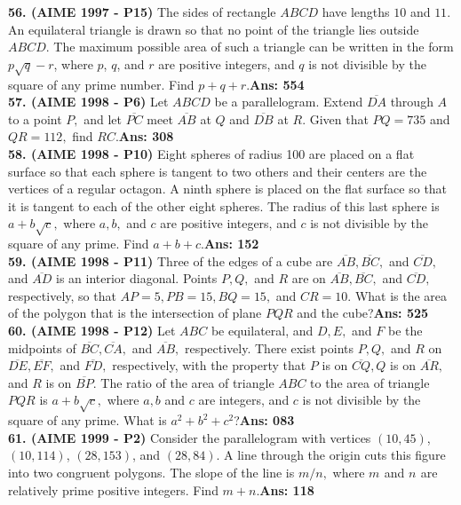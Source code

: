 \documentclass[letterpaper,10pt,addpoints]{exam}
\begin{document}
\textbf{56. (AIME 1997 - P15) }The sides of rectangle $ABCD$ have lengths $10$ and $11$. An equilateral triangle is drawn so that no point of the triangle lies outside $ABCD$. The maximum possible area of such a triangle can be written in the form $p\sqrt{q}-r$, where $p$, $q$, and $r$ are positive integers, and $q$ is not divisible by the square of any prime number. Find $p+q+r$.\quad\textbf{Ans: 554}\\

\textbf{57. (AIME 1998 - P6) }Let $ABCD$ be a parallelogram. Extend $\overline{DA}$ through $A$ to a point $P,$ and let $\overline{PC}$ meet $\overline{AB}$ at $Q$ and $\overline{DB}$ at $R.$ Given that $PQ = 735$ and $QR = 112,$ find $RC.$\quad\textbf{Ans: 308}\\

\textbf{58. (AIME 1998 - P10) }Eight spheres of radius 100 are placed on a flat surface so that each sphere is tangent to two others and their centers are the vertices of a regular octagon. A ninth sphere is placed on the flat surface so that it is tangent to each of the other eight spheres. The radius of this last sphere is $a +b\sqrt {c},$ where $a, b,$ and $c$ are positive integers, and $c$ is not divisible by the square of any prime. Find $a + b + c$.\quad\textbf{Ans: 152}\\

\textbf{59. (AIME 1998 - P11) }Three of the edges of a cube are $\overline{AB}, \overline{BC},$ and $\overline{CD},$ and $\overline{AD}$ is an interior diagonal. Points $P, Q,$ and $R$ are on $\overline{AB}, \overline{BC},$ and $\overline{CD},$ respectively, so that $AP = 5, PB = 15, BQ = 15,$ and $CR = 10.$ What is the area of the polygon that is the intersection of plane $PQR$ and the cube?\textbf{Ans: 525}\\

\textbf{60. (AIME 1998 - P12) }Let $ABC$ be equilateral, and $D, E,$ and $F$ be the midpoints of $\overline{BC}, \overline{CA},$ and $\overline{AB},$ respectively. There exist points $P, Q,$ and $R$ on $\overline{DE}, \overline{EF},$ and $\overline{FD},$ respectively, with the property that $P$ is on $\overline{CQ}, Q$ is on $\overline{AR},$ and $R$ is on $\overline{BP}.$ The ratio of the area of triangle $ABC$ to the area of triangle $PQR$ is $a + b\sqrt {c},$ where $a, b$ and $c$ are integers, and $c$ is not divisible by the square of any prime. What is $a^{2} + b^{2} + c^{2}$?\quad\textbf{Ans: 083}\\

\textbf{61. (AIME 1999 - P2) }Consider the parallelogram with vertices $(10,45)$, $(10,114)$, $(28,153)$, and $(28,84)$. A line through the origin cuts this figure into two congruent polygons. The slope of the line is $m/n,$ where $m_{}$ and $n_{}$ are relatively prime positive integers. Find $m+n$.\quad\textbf{Ans: 118}\\
\end{document}
